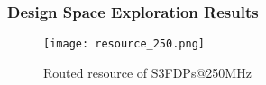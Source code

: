 \begin{frame}
    \frametitle{Design Space Exploration Results}


            \begin{figure}
                \centering
                \texttt{[image: resource\_250.png]}
                \caption{Routed resource of S3FDPs@250MHz}
                \label{fig:resource_utilization}
            \end{figure}

\end{frame}
